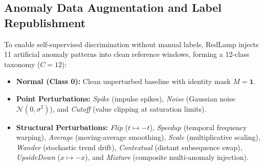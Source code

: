 \documentclass[sigconf,nonacm]{acmart}
\begin{document}
\par\vspace{11pt plus 3pt minus 2pt}\noindent
\begin{minipage}[b]{\columnwidth}
\setlength{\abovecaptionskip}{0pt}%
\setlength{\belowcaptionskip}{8pt}%
%
\label{tab:arch}%
\centering
\footnotesize
\setlength{\tabcolsep}{4pt}%
\end{minipage}\par\vspace{8pt plus 3pt minus 2pt}

\subsection{Anomaly Data Augmentation and Label Republishment}
To enable self-supervised discrimination without manual labels, RedLamp injects 11 artificial anomaly patterns into clean reference windows, forming a 12-class taxonomy ($C=12$):
\begin{itemize}
    \item \textbf{Normal (Class 0):} Clean unperturbed baseline with identity mask $M = \mathbf{1}$.
    \item \textbf{Point Perturbations:} \textit{Spike} (impulse spikes), \textit{Noise} (Gaussian noise $\mathcal{N}(0, \sigma^2)$), and \textit{Cutoff} (value clipping at saturation limits).
    \item \textbf{Structural Perturbations:} \textit{Flip} ($t \mapsto -t$), \textit{Speedup} (temporal frequency warping), \textit{Average} (moving-average smoothing), \textit{Scale} (multiplicative scaling), \textit{Wander} (stochastic trend drift), \textit{Contextual} (distant subsequence swap), \textit{UpsideDown} ($x \mapsto -x$), and \textit{Mixture} (composite multi-anomaly injection).
\end{itemize}
\end{document}
